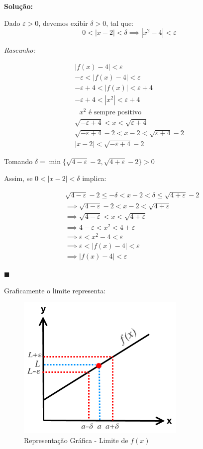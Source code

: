 \documentclass[oneside,a4paper,12pt]{article}
\begin{document}
{\bf Solução:}

Dado $\varepsilon > 0$, devemos exibir $\delta > 0$, tal que:
$$0<|x-2|<\delta \implies |x^2 - 4| < \varepsilon$$

{\it Rascunho:}

\begin{eqnarray*}
	|f(x) - 4| < \varepsilon \\
	-\varepsilon < |f(x) - 4| < \varepsilon \\
	-\varepsilon + 4 < |f(x)| < \varepsilon + 4 \\
	-\varepsilon + 4 < |x^2| < \varepsilon + 4\\
	\text{ $x^2$ é sempre positivo} \\
	\sqrt{-\varepsilon + 4} < x < \sqrt{\varepsilon + 4}\\
	\sqrt{-\varepsilon + 4} - 2 < x -2 < \sqrt{\varepsilon + 4} -2\\
	|x-2| < \sqrt{-\varepsilon +4} -2	
\end{eqnarray*}

Tomando $\delta = \min{\{ \sqrt{4 - \varepsilon}-2,\sqrt{4 + \varepsilon}-2\}}>0$

Assim, se $0<|x-2|<\delta$ implica:

\begin{eqnarray*}
	& \sqrt{4 - \varepsilon}-2 \leq -\delta < x - 2< \delta \leq \sqrt{4 + \varepsilon}-2 \\
	& \implies \sqrt{4 - \varepsilon}-2 < x - 2<  \sqrt{4 + \varepsilon}\\
	& \implies \sqrt{4 - \varepsilon} < x <  \sqrt{4 + \varepsilon} \\
	& \implies  4 - \varepsilon < x^2 < 4 + \varepsilon \\
	& \implies  \varepsilon < x^2 -4 < \varepsilon \\
	& \implies  \varepsilon < |f(x) -4| < \varepsilon \\
	& \implies  |f(x) - 4| < \varepsilon
\end{eqnarray*}
\begin{flushright}
	$\blacksquare$
\end{flushright}

Graficamente o limite representa:

\begin{figure}[!h]
	\centering
	\includegraphics[scale=0.6]{lim}
	\caption{Representação Gráfica - Limite de $f(x)$}
	\label{graflim}
\end{figure}
\end{document}
